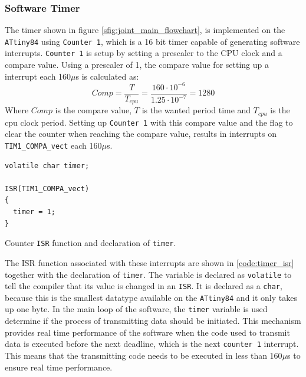 {\subsubsection{Software Timer}
\label{ssub:software_timer}
The timer shown in figure \ref{sfig:joint_main_flowchart}, is implemented on the \texttt{ATtiny84} using \texttt{Counter 1}, which is a 16 bit timer capable of generating software interrupts.
\texttt{Counter 1} is setup by setting a prescaler to the CPU clock and a compare value.
Using a prescaler of 1, the compare value for setting up a interrupt each 160$\mu$s is calculated as: 
\begin{equation}
	Comp = \frac{T}{T_{cpu}} = \frac{160 \cdot 10^{-6}}{1.25\cdot 10^{-7}} = 1280
\end{equation}
Where $Comp$ is the compare value, $T$ is the wanted period time and $T_{cpu}$ is the cpu clock period.
Setting up \texttt{Counter 1} with this compare value and the flag to clear the counter when reaching the compare value, results in interrupts on \texttt{TIM1\_COMPA\_vect} each 160$\mu$s.

\begin{listing}[h] 
\begin{verbatim}
volatile char timer;

ISR(TIM1_COMPA_vect)
{ 
  timer = 1;
}
\end{verbatim}
\caption{Counter \texttt{ISR} function and declaration of \texttt{timer}.}
\label{code:timer_isr}
\end{listing}

The ISR function associated with these interrupts are shown in \ref{code:timer_isr} together with the declaration of \texttt{timer}.
The variable is declared as \texttt{volatile} to tell the compiler that its value is changed in an \texttt{ISR}. 
It is declared as a \texttt{char}, because this is the smallest datatype available on the \texttt{ATtiny84} and it only takes up one byte. 
In the main loop of the software, the \texttt{timer} variable is used determine if the process of transmitting data should be initiated.
This mechanism provides real time performance of the software when the code used to transmit data is executed before the next deadline, which is the next \texttt{counter 1} interrupt.
This means that the transmitting code needs to be executed in less than 160$\mu$s to ensure real time performance.

}
